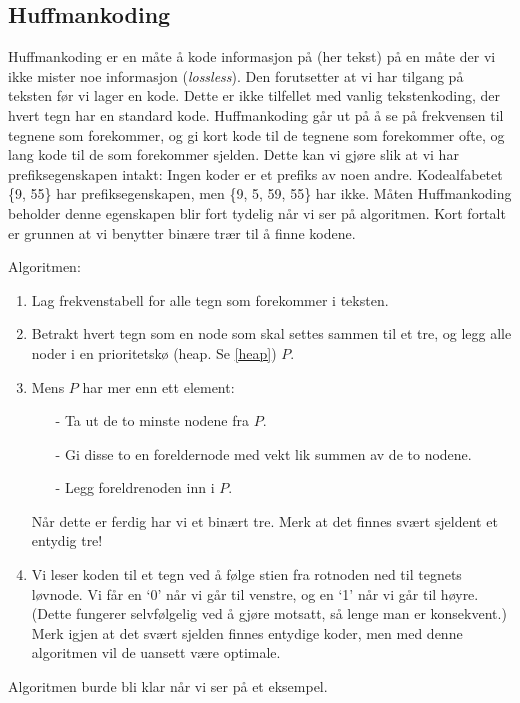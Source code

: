 	\subsection{Huffmankoding}\label{huffman}
		Huffmankoding er en måte å kode informasjon på (her tekst) på en måte der vi ikke mister noe informasjon (\textit{lossless}). Den forutsetter at vi har tilgang på teksten før vi lager en kode. Dette er ikke tilfellet med vanlig tekstenkoding, der hvert tegn har en standard kode. Huffmankoding går ut på å se på frekvensen til tegnene som forekommer, og gi kort kode til de tegnene som forekommer ofte, og lang kode til de som forekommer sjelden. Dette kan vi gjøre slik at vi har prefiksegenskapen intakt: Ingen koder er et prefiks av noen andre. Kodealfabetet \{9, 55\} har prefiksegenskapen, men \{9, 5, 59, 55\} har ikke. Måten Huffmankoding beholder denne egenskapen blir fort tydelig når vi ser på algoritmen. Kort fortalt er grunnen at vi benytter binære trær til å finne kodene.
		
		Algoritmen:
		\begin{enumerate}
			\item Lag frekvenstabell for alle tegn som forekommer i teksten.
			\item Betrakt hvert tegn som en node som skal settes sammen til et tre, og legg alle noder i en prioritetskø (heap. Se \ref{heap}) $P$.
			\item Mens $P$ har mer enn ett element:
				\begin{itemize}
					\item[-] Ta ut de to minste nodene fra $P$.	
					\item[-] Gi disse to en foreldernode med vekt lik summen av de to nodene.	
					\item[-] Legg foreldrenoden inn i $P$.	
				\end{itemize}
				Når dette er ferdig har vi et binært tre. Merk at det finnes svært sjeldent et entydig tre!
			\item Vi leser koden til et tegn ved å følge stien fra rotnoden ned til tegnets løvnode. Vi får en `0' når vi går til venstre, og en `1' når vi går til høyre. (Dette fungerer selvfølgelig ved å gjøre motsatt, så lenge man er konsekvent.) Merk igjen at det svært sjelden finnes entydige koder, men med denne algoritmen vil de uansett være optimale.
		\end{enumerate}
		Algoritmen burde bli klar når vi ser på et eksempel.

